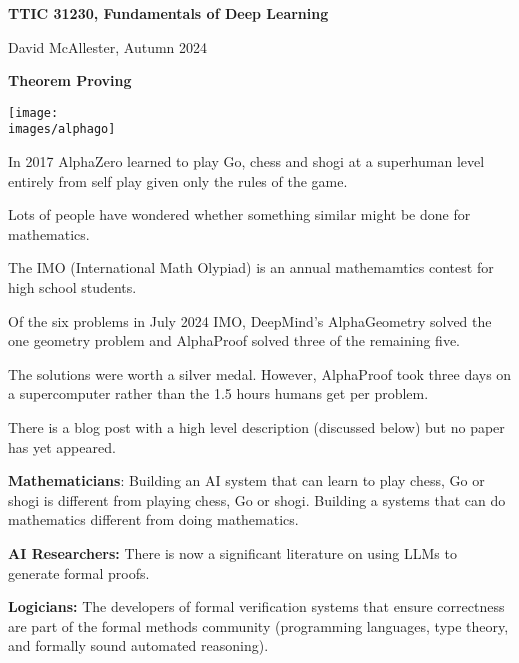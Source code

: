 




{\Huge

  \centerline{\bf TTIC 31230, Fundamentals of Deep Learning}

  
\bigskip

\centerline{David McAllester, Autumn  2024}


\vfill

\centerline{\bf Theorem Proving}

\vfill
\vfill



\centerline{\texttt{[image: \\images/alphago]}}

\vfill

In 2017 AlphaZero learned to play Go, chess and shogi at a superhuman level entirely from self play
given only the rules of the game.

\vfill
Lots of people have wondered whether something similar might be done for mathematics.


The IMO (International Math Olypiad) is an annual mathemamtics contest for high school students.

\vfill
Of the six problems in July 2024 IMO, DeepMind's AlphaGeometry solved the one geometry problem and AlphaProof solved three of the remaining five.

\vfill
The solutions were worth a silver medal.  However, AlphaProof took three days on a supercomputer rather than
the 1.5 hours humans get per problem.

\vfill
There is a blog post with a high level description (discussed below) but no paper has yet appeared.


{\bf Mathematicians}: Building an AI system that can learn to play chess, Go or shogi is different from playing
chess, Go or shogi. Building a systems that can do mathematics different from doing mathematics.


\vfill
{\bf AI Researchers:} There is now a significant literature on using LLMs to generate formal proofs.

\vfill
{\bf Logicians:} The developers of formal verification systems that ensure correctness
are part of the formal methods community (programming languages, type theory, and formally sound automated reasoning).

}

